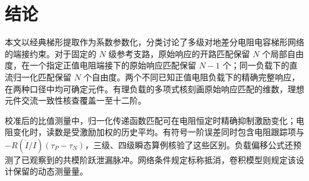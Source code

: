 \section{结论}

本文以经典梯形提取作为系数参数化，分类讨论了多级对地差分电阻电容梯形网络的端接约束。对于固定的 $N$ 级参考支路，原始响应的开路匹配保留 $N$ 个局部自由度，在一个指定正值电阻端接下的原始响应匹配保留 $N-1$ 个；同一负载下的直流归一化匹配保留 $N$ 个自由度。两个不同已知正值电阻负载下的精确完整响应，在两种口径中均可确定元件。有理负载的多项式核刻画原始响应匹配的维数，理想元件交流一致性核查覆盖一至十二阶。

校准后的比值测量中，归一化传递函数匹配可在电阻恒定时精确抑制激励变化；电阻变化时，读数是受激励加权的历史平均。有符号一阶误差同时包含电阻跟踪项与 $-R(\dot I/I)(\tau_P-\tau_N)$，三级、四级瞬态算例核验了这些区别。负载偏移公式还预测了已观察到的共模阶跃泄漏脉冲。网络条件规定标称抵消，卷积模型则规定该设计保留的动态测量量。

